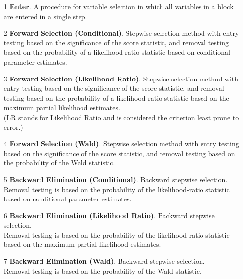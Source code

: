 \documentclass[a4paper,12pt]{article}
\begin{document}
\begin{itemize}
	\item[1] \textbf{Enter}. A procedure for variable selection in which all variables in a block are entered in a
	single step.
	\item[2] \textbf{Forward Selection (Conditional)}. Stepwise selection method with entry testing based on
	the significance of the score statistic, and removal testing based on the probability of a
	likelihood-ratio statistic based on conditional parameter estimates.
	\item[3] \textbf{Forward Selection (Likelihood Ratio)}. Stepwise selection method with entry testing based
	on the significance of the score statistic, and removal testing based on the probability of a
	likelihood-ratio statistic based on the maximum partial likelihood estimates. \\ (LR stands for Likelihood Ratio and  is considered the criterion least prone to error.)
	\item[4] \textbf{Forward Selection (Wald)}. Stepwise selection method with entry testing based on the
	significance of the score statistic, and removal testing based on the probability of the Wald
	statistic.
	\item[5] \textbf{Backward Elimination (Conditional)}. Backward stepwise selection. \\ Removal testing is based on
	the probability of the likelihood-ratio statistic based on conditional parameter estimates.
	\item[6] \textbf{Backward Elimination (Likelihood Ratio)}. Backward stepwise selection. \\ Removal testing
	is based on the probability of the likelihood-ratio statistic based on the maximum partial
	likelihood estimates.
	\item[7] \textbf{Backward Elimination (Wald)}. Backward stepwise selection. \\ Removal testing is based on the
	probability of the Wald statistic.
\end{itemize}


\end{document}
